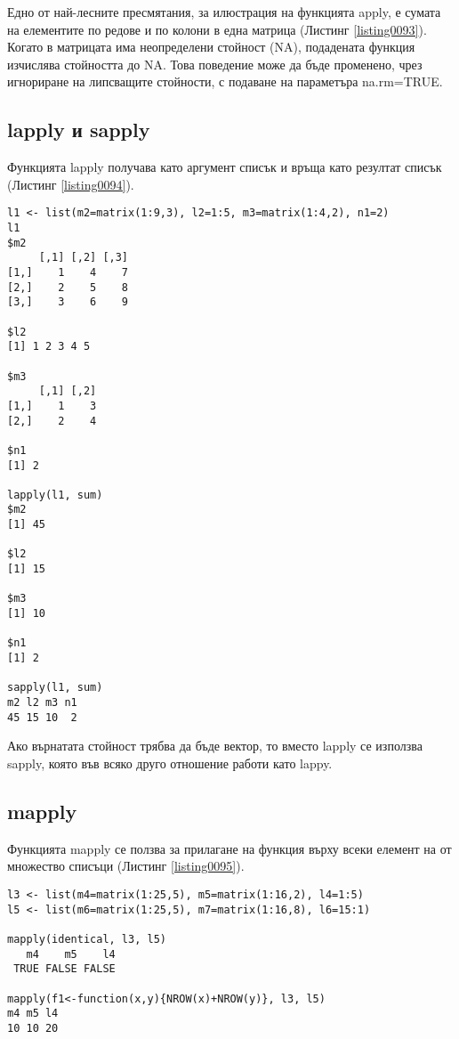 Едно от най-лесните пресмятания, за илюстрация на функцията apply, е сумата на елементите по редове и по колони в една матрица (Листинг \ref{listing0093}). Когато в матрицата има неопределени стойност (NA), подадената функция изчислява стойността до NA. Това поведение може да бъде променено, чрез игнориране на липсващите стойности, с подаване на параметъра na.rm=TRUE.

\subsection{lapply и sapply}

Функцията lapply получава като аргумент списък и връща като резултат списък (Листинг \ref{listing0094}). 

\begin{lstlisting}[caption=Сума на обекти в списък, label=listing0094]
l1 <- list(m2=matrix(1:9,3), l2=1:5, m3=matrix(1:4,2), n1=2)
l1
$m2
     [,1] [,2] [,3]
[1,]    1    4    7
[2,]    2    5    8
[3,]    3    6    9

$l2
[1] 1 2 3 4 5

$m3
     [,1] [,2]
[1,]    1    3
[2,]    2    4

$n1
[1] 2

lapply(l1, sum)
$m2
[1] 45

$l2
[1] 15

$m3
[1] 10

$n1
[1] 2

sapply(l1, sum)
m2 l2 m3 n1 
45 15 10  2
\end{lstlisting}

Ако върнатата стойност трябва да бъде вектор, то вместо lapply се използва sapply, която във всяко друго отношение работи като lappy. 

\subsection{mapply}

Функцията mapply се ползва за прилагане на функция върху всеки елемент на от множество списъци (Листинг \ref{listing0095}). 
\begin{lstlisting}[caption=Проверка за идентичност на елементите, label=listing0095]
l3 <- list(m4=matrix(1:25,5), m5=matrix(1:16,2), l4=1:5)
l5 <- list(m6=matrix(1:25,5), m7=matrix(1:16,8), l6=15:1)

mapply(identical, l3, l5)
   m4    m5    l4 
 TRUE FALSE FALSE

mapply(f1<-function(x,y){NROW(x)+NROW(y)}, l3, l5)
m4 m5 l4 
10 10 20 
\end{lstlisting}

